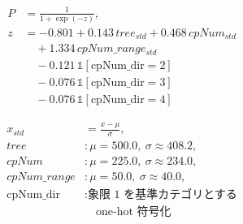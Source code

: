 \begin{equation}
\label{eq:logistic_all_scaled_prospect}
\begin{aligned}
  P &= \frac{1}{1 + \exp(-z)}, \\
  z &= -0.801 + 0.143\, tree_{std} + 0.468\, cpNum_{std} \\
    &\quad + 1.334\, cpNum\_range_{std} \\
    &\quad - 0.121\, \mathbb{1}[\mathrm{cpNum\_dir}{=}2] \\
    &\quad - 0.076\, \mathbb{1}[\mathrm{cpNum\_dir}{=}3] \\
    &\quad - 0.076\, \mathbb{1}[\mathrm{cpNum\_dir}{=}4]
\end{aligned}
\end{equation}

\begin{equation}
\label{eq:standardization_task2}
\begin{aligned}
  x_{std} &= \frac{x - \mu}{\sigma}, \\
  tree &: \mu=500.0,\ \sigma \approx 408.2, \\
  cpNum &: \mu=225.0,\ \sigma \approx 234.0, \\
  cpNum\_range &: \mu=50.0,\ \sigma \approx 40.0, \\
  \mathrm{cpNum\_dir} &: \text{象限 1 を基準カテゴリとする} \\
    &\quad \text{one-hot 符号化}
\end{aligned}
\end{equation}
